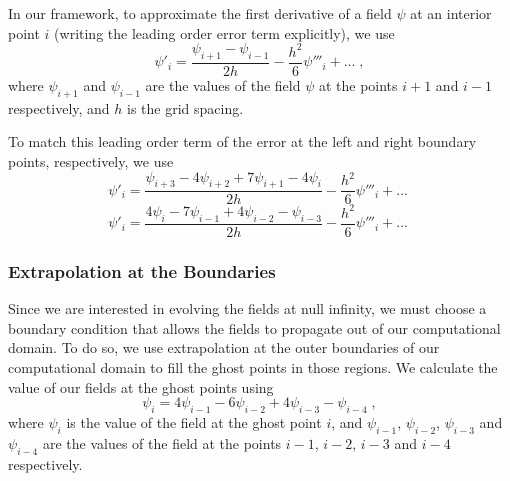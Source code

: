 In our framework, to approximate the first derivative of a field $\psi$ at an interior point $i$ (writing the leading order error term explicitly), we use 
%
\begin{equation}
    \psi'_i = \frac{\psi_{i+1} - \psi_{i-1}}{2h} - \frac{h^2}{6} \psi'''_i + ...\; ,
\end{equation}
%
where $\psi_{i+1}$ and $\psi_{i-1}$ are the values of the field $\psi$ at the points $i+1$ and $i-1$ respectively, and $h$ is the grid spacing.

To match this leading order term of the error at the left and right boundary points, respectively, we use
%
\begin{equation}
    \psi'_i = \frac{\psi_{i+3} - 4 \psi_{i+2} + 7 \psi_{i+1} - 4 \psi_{i}}{2h} - \frac{h^2}{6} \psi'''_i + ...\;
\end{equation}
%
\begin{equation}
    \psi'_i = \frac{4 \psi_{i} - 7 \psi_{i-1} + 4 \psi_{i-2} - \psi_{i-3}}{2h} - \frac{h^2}{6} \psi'''_i + ...\;
\end{equation}


\subsubsection{Extrapolation at the Boundaries}

Since we are interested in evolving the fields at null infinity, we must choose a boundary condition that allows the fields to propagate out of our computational domain. To do so, we use extrapolation at the outer boundaries of our computational domain to fill the ghost points in those regions. We calculate the value of our fields at the ghost points using
%
\begin{equation}
    \psi_i = 4 \psi_{i-1} - 6 \psi_{i-2} + 4 \psi_{i-3} - \psi_{i-4} \; ,
\end{equation}
%
where $\psi_i$ is the value of the field at the ghost point $i$, and $\psi_{i-1}$, $\psi_{i-2}$, $\psi_{i-3}$ and $\psi_{i-4}$ are the values of the field at the points $i-1$, $i-2$, $i-3$ and $i-4$ respectively.

